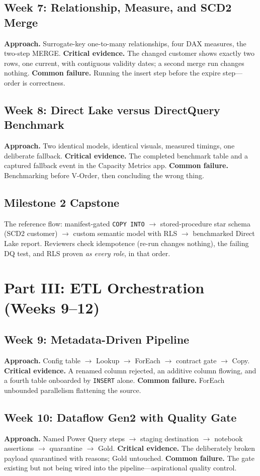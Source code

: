 \subsection{Week 7: Relationship, Measure, and SCD2 Merge}
\textbf{Approach.} Surrogate-key one-to-many relationships, four DAX measures, the two-step
MERGE. \textbf{Critical evidence.} The changed customer shows exactly two rows, one current,
with contiguous validity dates; a second merge run changes nothing. \textbf{Common failure.}
Running the insert step before the expire step---order is correctness.

\subsection{Week 8: Direct Lake versus DirectQuery Benchmark}
\textbf{Approach.} Two identical models, identical visuals, measured timings, one deliberate
fallback. \textbf{Critical evidence.} The completed benchmark table and a captured fallback event
in the Capacity Metrics app. \textbf{Common failure.} Benchmarking before V-Order, then
concluding the wrong thing.

\subsection{Milestone 2 Capstone}
The reference flow: manifest-gated \texttt{COPY INTO} $\rightarrow$ stored-procedure star schema
(SCD2 customer) $\rightarrow$ custom semantic model with RLS $\rightarrow$ benchmarked Direct Lake
report. Reviewers check idempotence (re-run changes nothing), the failing DQ test, and RLS proven
\emph{as every role}, in that order.

\section{Part III: ETL Orchestration (Weeks 9--12)}
\subsection{Week 9: Metadata-Driven Pipeline}
\textbf{Approach.} Config table $\rightarrow$ Lookup $\rightarrow$ ForEach $\rightarrow$ contract
gate $\rightarrow$ Copy. \textbf{Critical evidence.} A renamed column rejected, an additive column
flowing, and a fourth table onboarded by \texttt{INSERT} alone. \textbf{Common failure.} ForEach
unbounded parallelism flattening the source.

\subsection{Week 10: Dataflow Gen2 with Quality Gate}
\textbf{Approach.} Named Power Query steps $\rightarrow$ staging destination $\rightarrow$
notebook assertions $\rightarrow$ quarantine $\rightarrow$ Gold. \textbf{Critical evidence.} The
deliberately broken payload quarantined with reasons; Gold untouched. \textbf{Common failure.}
The gate existing but not being wired into the pipeline---aspirational quality control.

